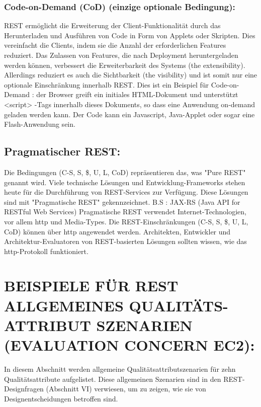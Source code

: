 \documentclass{acmsiggraph}
\begin{document}
\subsubsection{Code-on-Demand (CoD) (einzige optionale Bedingung):}	
REST ermöglicht die Erweiterung der Client-Funktionalität durch das Herunterladen und Ausführen von Code in Form von Applets oder Skripten.
Dies vereinfacht die Clients, indem sie die Anzahl der erforderlichen Features reduziert.
Das Zulassen von Features, die nach Deployment heruntergeladen werden können, verbessert die Erweiterbarkeit des Systems (the extensibility).
Allerdings reduziert es auch die Sichtbarkeit (the visibility) und ist somit nur eine optionale Einschränkung innerhalb REST.
Dies ist ein Beispiel für Code-on-Demand : der Browser greift ein initiales HTML-Dokument und unterstützt <script> -Tags innerhalb dieses Dokuments, so dass eine Anwendung on-demand geladen werden kann.
Der Code kann ein Javascript, Java-Applet oder sogar eine Flash-Anwendung sein.

\subsection{Pragmatischer REST:}
Die Bedingungen (C-S, S, \$, U, L, CoD) repräsentieren das, was "Pure REST" genannt wird.
Viele technische Lösungen und Entwicklung-Frameworks stehen heute  für die Durchführung von REST-Services zur Verfügung. Diese Lösungen sind mit "Pragmatische REST" gekennzeichnet. B.S : JAX-RS (Java API for RESTful Web Services)
Pragmatische REST verwendet Internet-Technologien, vor allem http und Media-Types. Die REST-Einschränkungen (C-S, S, \$, U, L, CoD) können über http angewendet werden.
Architekten, Entwickler und Architektur-Evaluatoren von REST-basierten Lösungen sollten wissen, wie das http-Protokoll funktioniert.

\section{BEISPIELE FÜR REST ALLGEMEINES QUALITÄTS-ATTRIBUT SZENARIEN (EVALUATION CONCERN EC2):}
In diesem Abschnitt werden allgemeine Qualitätsattributszenarien für zehn Qualitätsattribute aufgelistet.
Diese allgemeinen Szenarien sind in den REST-Designfragen (Abschnitt VI) verwiesen, um zu zeigen, wie sie von Designentscheidungen betroffen sind.
\vspace{4px}
\end{document}
